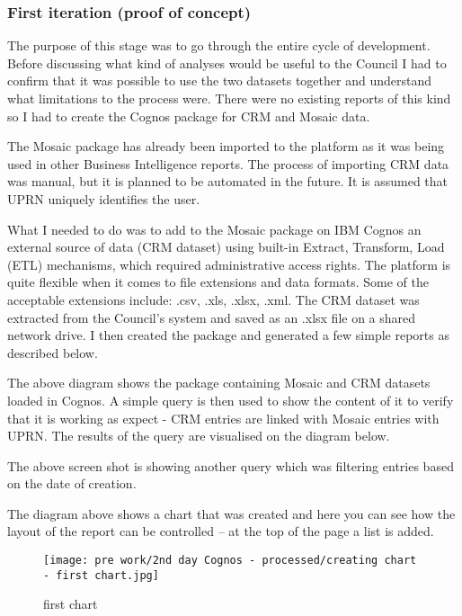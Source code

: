 			\subsubsection{First iteration (proof of concept)}
			
The purpose of this stage was to go through the entire cycle of development. Before discussing what kind of analyses would be useful to the Council I had to confirm that it was possible to use the two datasets together and understand what limitations to the process were. There were no existing reports of this kind so I had to create the Cognos package for CRM and Mosaic data.

The Mosaic package has already been imported to the platform as it was being used in other Business Intelligence reports. The process of importing CRM data was manual, but it is planned to be automated in the future. It is assumed that UPRN uniquely identifies the user.

What I needed to do was to add to the Mosaic package on IBM Cognos an external source of data (CRM dataset) using built-in Extract, Transform, Load (ETL) mechanisms, which required administrative access rights. The platform is quite flexible when it comes to file extensions and data formats. Some of the acceptable extensions include: .csv, .xls, .xlsx, .xml. The CRM dataset was extracted from the Council’s system and saved as an .xlsx file on a shared network drive. I then created the package and generated a few simple reports as described below.

The above diagram shows the package containing Mosaic and CRM datasets loaded in Cognos. A simple query is then used to show the content of it to verify that it is working as expect - CRM entries are linked with Mosaic entries with UPRN. The results of the query are visualised on the diagram below.

The above screen shot is showing another query which was filtering entries based on the date of creation.

The diagram above shows a chart that was created and here you can see how the layout of the report can be controlled – at the top of the page a list is added.

\begin{figure}[hp]
\centering
     \texttt{[image: pre work/2nd day Cognos - processed/creating chart - first chart.jpg]}
      \caption{first chart}
       \label{normal_case}
\end{figure}

